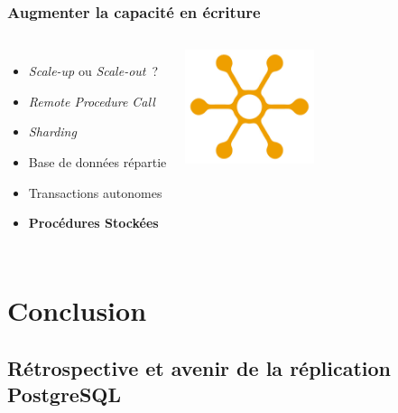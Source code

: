 \documentclass[english]{beamer}
\begin{document}
\begin{frame}[fragile]
  \frametitle{Augmenter la capacité en écriture}

  \linebreak
  \linebreak

\begin{columns}[c]

  \begin{itemize}
   \item<1-> \textit{Scale-up} ou \textit{Scale-out} ?
   \item<2-> \textit{Remote Procedure Call}
   \item<3-> \textit{Sharding}
   \item<3-> Base de données répartie
   \item<4-> Transactions autonomes
   \item<5-> \textbf{Procédures Stockées}
  \end{itemize}  

\includegraphics[height=9em]{distribution.jpg}
\end{columns}
\end{frame}



\section{Conclusion}
\subsection{Rétrospective et avenir de la réplication PostgreSQL}
\frame{\tableofcontents[currentsubsection]}
\end{document}
